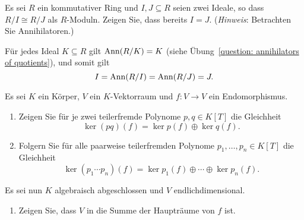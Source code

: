 \begin{question}
  Es sei $R$ ein kommutativer Ring und $I, J \subseteq R$ seien zwei Ideale, so dass $R/I \cong R/J$ als $R$-Moduln.
  Zeigen Sie, dass bereits $I = J$.
  (\emph{Hinweis}:
   Betrachten Sie Annihilatoren.)
\end{question}


\begin{solution}
  Für jedes Ideal $K \subseteq R$ gilt $\operatorname{Ann}(R/K) = K$ (siehe Übung~\ref{question: annihilators of quotients}), und somit gilt
  \[
      I
    = \operatorname{Ann}(R/I)
    = \operatorname{Ann}(R/J)
    = J.
  \]
\end{solution}


\begin{question}[subtitle = Existenz der Hauptraumzerlegung]
  Es sei $K$ ein Körper, $V$ ein $K$-Vektorraum und $f \colon V \to V$ ein Endomorphismus.
  \begin{enumerate}
    \item
      Zeigen Sie für je zwei teilerfremde Polynome $p, q \in K[T]$ die Gleichheit
      \[
        \ker {(pq)(f)} = \ker p(f) \oplus \ker q(f).
      \]
    \item
      Folgern Sie für alle paarweise teilerfremden Polynome $p_1, \dotsc, p_n \in K[T]$ die Gleichheit
      \[
          \ker {(p_1 \dotsm p_n)(f)}
        = \ker p_1(f) \oplus \dotsb \oplus \ker p_n(f).
      \]
  \end{enumerate}
  Es sei nun $K$ algebraisch abgeschlossen und $V$ endlichdimensional.
  \begin{enumerate}[resume]
    \item
      Zeigen Sie, dass $V$ in die Summe der Haupträume von $f$ ist.
  \end{enumerate}
\end{question}


